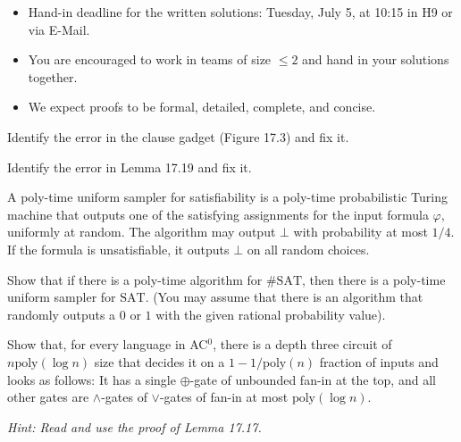 \documentclass[english]{uebung_cs}
\begin{document}
\begin{itemize}
  \item Hand-in deadline for the written solutions: Tuesday, July 5, at 10:15 in H9 or via E-Mail.
  \item You are encouraged to work in teams of size $\le 2$ and hand in your solutions together.
  \item We expect proofs to be formal, detailed, complete, and concise.
\end{itemize}

\begin{aufgabe}
  Identify the error in the clause gadget (Figure 17.3) and fix it.
\end{aufgabe}

\begin{aufgabe}
  Identify the error in Lemma 17.19 and fix it.
\end{aufgabe}

\begin{aufgabe}
  A poly-time uniform sampler for satisfiability is a poly-time probabilistic Turing machine
  that outputs one of the satisfying assignments for the input formula
  $\varphi$, uniformly at random. The algorithm may output $\bot$ with
  probability at most $1/4$. If the formula is unsatisfiable, it
  outputs $\bot$ on all random choices.

  Show that if there is a poly-time algorithm for $\#\mathrm{SAT}$, then there is a poly-time uniform sampler for $\mathrm{SAT}$. (You may assume that there is an algorithm that randomly outputs a $0$ or $1$ with the given rational probability value).
\end{aufgabe}

\begin{aufgabe}[Exercise 17.6]
Show that, for every language in AC$^0$, there is a depth three circuit of $n \mathrm{poly}(\log n)$ size that decides it on a $1−1/\mathrm{poly}(n)$ fraction of inputs and looks as follows:
It has a single $\oplus$-gate of unbounded fan-in at the top, and all other gates are $\wedge$-gates of $\vee$-gates of fan-in at most $\mathrm{poly}(\log n)$.

\emph{Hint: Read and use the proof of Lemma 17.17.}
\end{aufgabe}
\end{document}
